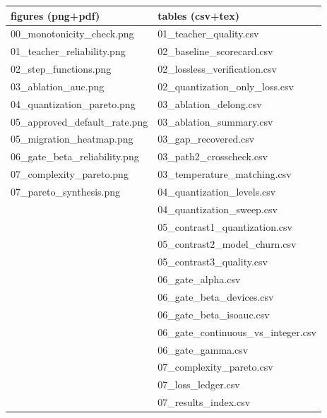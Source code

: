 \begin{tabular}{ll}
\toprule
figures (png+pdf) & tables (csv+tex) \\
\midrule
00_monotonicity_check.png & 01_teacher_quality.csv \\
01_teacher_reliability.png & 02_baseline_scorecard.csv \\
02_step_functions.png & 02_lossless_verification.csv \\
03_ablation_auc.png & 02_quantization_only_loss.csv \\
04_quantization_pareto.png & 03_ablation_delong.csv \\
05_approved_default_rate.png & 03_ablation_summary.csv \\
05_migration_heatmap.png & 03_gap_recovered.csv \\
06_gate_beta_reliability.png & 03_path2_crosscheck.csv \\
07_complexity_pareto.png & 03_temperature_matching.csv \\
07_pareto_synthesis.png & 04_quantization_levels.csv \\
 & 04_quantization_sweep.csv \\
 & 05_contrast1_quantization.csv \\
 & 05_contrast2_model_churn.csv \\
 & 05_contrast3_quality.csv \\
 & 06_gate_alpha.csv \\
 & 06_gate_beta_devices.csv \\
 & 06_gate_beta_isoauc.csv \\
 & 06_gate_continuous_vs_integer.csv \\
 & 06_gate_gamma.csv \\
 & 07_complexity_pareto.csv \\
 & 07_loss_ledger.csv \\
 & 07_results_index.csv \\
\bottomrule
\end{tabular}
